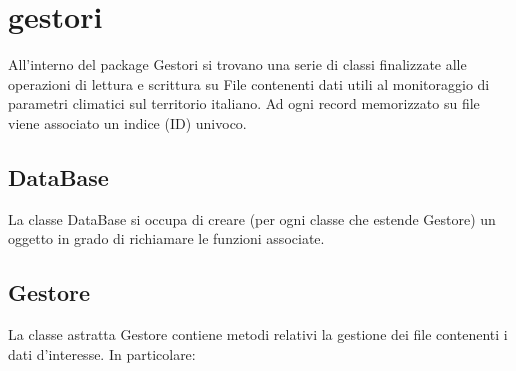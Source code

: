 \documentclass[a4paper, 12pt]{scrreprt}
\begin{document}
		\section{gestori}
		All'interno del package Gestori si trovano una serie di classi finalizzate alle operazioni di lettura e scrittura su File contenenti dati utili al monitoraggio di parametri climatici sul territorio italiano.
		Ad ogni record memorizzato su file viene associato un indice (ID) univoco.
			\subsection{DataBase}
			La classe DataBase si occupa di creare (per ogni classe che estende Gestore) un oggetto in grado di richiamare le funzioni associate.
			\subsection{Gestore}
			La classe astratta Gestore contiene metodi relativi la gestione dei file contenenti i dati d'interesse. In particolare:
\end{document}

